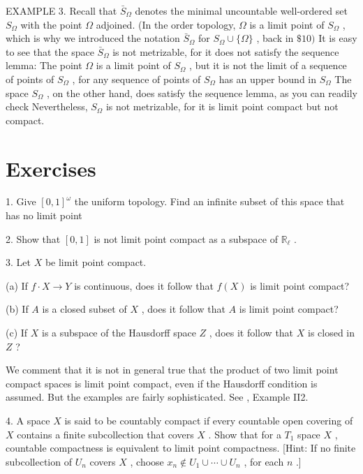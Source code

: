 EXAMPLE 3. Recall that \({\bar{S}}_{\Omega }\) denotes the minimal uncountable well-ordered set \({S}_{\Omega }\) with the point \(\Omega\) adjoined. (In the order topology, \(\Omega\) is a limit point of \({S}_{\Omega }\) , which is why we introduced the notation \({\bar{S}}_{\Omega }\) for \({S}_{\Omega } \cup  \{ \Omega \}\) , back in \(\$ {10})\) It is easy to see that the space \({\bar{S}}_{\Omega }\) is not metrizable, for it does not satisfy the sequence lemma: The point \(\Omega\) is a limit point of \({S}_{\Omega }\) , but it is not the limit of a sequence of points of \({S}_{\Omega }\) , for any sequence of points of \({S}_{\Omega }\) has an upper bound in \({S}_{\Omega }\) The space \({S}_{\Omega }\) , on the other hand, does satisfy the sequence lemma, as you can readily check Nevertheless, \({S}_{\Omega }\) is not metrizable, for it is limit point compact but not compact.

\section*{Exercises}

1. Give \({\left\lbrack  0,1\right\rbrack  }^{\omega }\) the uniform topology. Find an infinite subset of this space that has no limit point

2. Show that \(\left\lbrack  {0,1}\right\rbrack\) is not limit point compact as a subspace of \({\mathbb{R}}_{\ell }\) .

3. Let \(X\) be limit point compact.

(a) If \(f \cdot  X \rightarrow  Y\) is continuous, does it follow that \(f\left( X\right)\) is limit point compact?

(b) If \(A\) is a closed subset of \(X\) , does it follow that \(A\) is limit point compact?

(c) If \(X\) is a subspace of the Hausdorff space \(Z\) , does it follow that \(X\) is closed in \(Z\) ?

We comment that it is not in general true that the product of two limit point compact spaces is limit point compact, even if the Hausdorff condition is assumed. But the examples are fairly sophisticated. See \cite{SteenSeebach1970}, Example II2.

4. A space \(X\) is said to be countably compact if every countable open covering of \(X\) contains a finite subcollection that covers \(X\) . Show that for a \({T}_{1}\) space \(X\) , countable compactness is equivalent to limit point compactness. [Hint: If no finite subcollection of \({U}_{n}\) covers \(X\) , choose \({x}_{n} \notin  {U}_{1} \cup  \cdots  \cup  {U}_{n}\) , for each \(n\) .]

